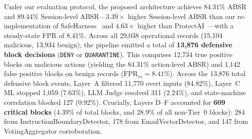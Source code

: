 \documentclass[runningheads]{llncs}
\begin{document}
\begin{table}[t]
\centering
\caption{Comparative Performance on AgentDojo-Derived Corpus (29,038 Records, 21,825 Sessions). SafeHarness results are from our re-implementation of its published architecture.}
\label{tab:main_results}
\end{table}

Under our evaluation protocol, the proposed architecture achieves 84.31\% ABSR and 89.44\% Session-level ABSR---$3.39\times$ higher Session-level ABSR than our re-implementation of SafeHarness~\cite{liu2024safeharness} and $4.63\times$ higher than ProtectAI~\cite{protectai2024}---with a steady-state FPR of 8.41\%. Across all 29,038 operational records (15,104 malicious, 13,934 benign), the pipeline emitted a total of \textbf{13,876 defensive block decisions} (\texttt{DENY} or \texttt{QUARANTINE}). This comprises 12,734 true positive blocks on malicious actions (yielding the 84.31\% action-level ABSR) and 1,142 false positive blocks on benign records ($\text{FPR}_{ss} = 8.41\%$). Across the 13,876 total defensive block events, Layer~A filtered 11,770 overt inputs (84.82\%), Layer~C ML stopped 1,059 (7.63\%), LLM Judge resolved 311 (2.24\%), and state-machine correlation blocked 127 (0.92\%). Crucially, Layers D--F accounted for \textbf{609 critical blocks} (4.39\% of total blocks, and 28.9\% of all non-Tier~0 blocks): 284 from InstructionBoundaryDetector, 178 from EmailVectorDetector, and 147 from VotingAggregator corroboration.
\end{document}
